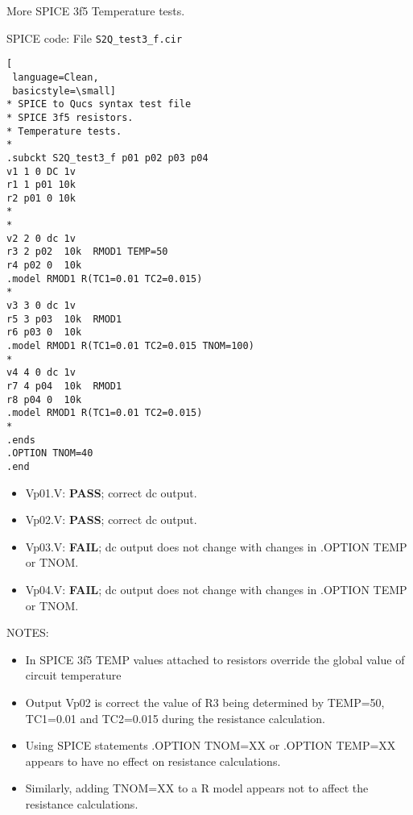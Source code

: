 
\begin{flushleft}
 More SPICE 3f5 Temperature tests.

SPICE code: File \verb|S2Q_test3_f.cir|
\begin{lstlisting}[
 language=Clean, 
 basicstyle=\small]
* SPICE to Qucs syntax test file 
* SPICE 3f5 resistors.
* Temperature tests.
*
.subckt S2Q_test3_f p01 p02 p03 p04 
v1 1 0 DC 1v
r1 1 p01 10k
r2 p01 0 10k
*
*
v2 2 0 dc 1v
r3 2 p02  10k  RMOD1 TEMP=50
r4 p02 0  10k
.model RMOD1 R(TC1=0.01 TC2=0.015)
*
v3 3 0 dc 1v
r5 3 p03  10k  RMOD1 
r6 p03 0  10k
.model RMOD1 R(TC1=0.01 TC2=0.015 TNOM=100)
*
v4 4 0 dc 1v
r7 4 p04  10k  RMOD1
r8 p04 0  10k
.model RMOD1 R(TC1=0.01 TC2=0.015)
*
.ends
.OPTION TNOM=40
.end
\end{lstlisting}
\end{flushleft}

\begin{flushleft}

\begin{itemize}
 \item Vp01.V: \textbf{PASS}; correct dc output.
 \item Vp02.V: \textbf{PASS}; correct dc output.
 \item Vp03.V: \textbf{FAIL}; dc output does not change with changes in .OPTION TEMP or TNOM.
 \item Vp04.V: \textbf{FAIL}; dc output does not change with changes in .OPTION TEMP or TNOM.
\end{itemize}

NOTES: \begin{itemize}
\item In SPICE 3f5 TEMP values attached to resistors override the global value of circuit temperature
\item Output Vp02 is correct the value of R3 being determined by TEMP=50, TC1=0.01 and TC2=0.015 during the resistance calculation. 
\item Using SPICE statements .OPTION TNOM=XX or .OPTION TEMP=XX appears to have no effect on resistance calculations.
\item Similarly, adding TNOM=XX to a R model appears not to affect the resistance calculations. 

                                  \end{itemize}

\end{flushleft}

